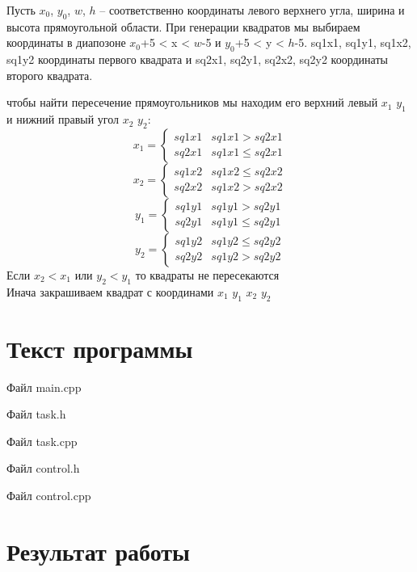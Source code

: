 \documentclass[14pt, a4paper]{extreport}
\begin{document}
Пусть $x_0$, $y_0$, $w$, $h$ -- соответственно координаты левого верхнего угла, ширина и высота прямоугольной области.
При генерации квадратов мы выбираем координаты в диапозоне $x_0$+5 < x < $w$-5 и $y_0$+5 < y < $h$-5.
sq1x1, sq1y1, sq1x2, sq1y2 координаты первого квадрата и sq2x1, sq2y1, sq2x2, sq2y2 координаты второго квадрата.
\par чтобы найти пересечение прямоугольников мы находим его верхний левый $x_1$ $y_1$ и нижний правый угол $x_2$ $y_2$:
$$ x_1 = \left\{ \begin{array}{lr} sq1x1 & sq1x1 > sq2x1\\ sq2x1 & sq1x1 \leq sq2x1 \end{array} \right. $$
$$ x_2 = \left\{ \begin{array}{lr} sq1x2 & sq1x2 \leq sq2x2\\ sq2x2 & sq1x2 > sq2x2 \end{array} \right. $$
$$ y_1 = \left\{ \begin{array}{lr} sq1y1 & sq1y1 > sq2y1\\ sq2y1 & sq1y1 \leq sq2y1 \end{array} \right. $$
$$ y_2 = \left\{ \begin{array}{lr} sq1y2 & sq1y2 \leq sq2y2\\ sq2y2 & sq1y2 > sq2y2 \end{array} \right. $$
Если $x_2 < x_1$ или $y_2 < y_1$ то квадраты не пересекаются\\
Инача закрашиваем квадрат с координами $x_1$ $y_1$ $x_2$ $y_2$


\chapter{Текст программы}

\noindent Файл main.cpp

\pagebreak
\hrulefill

\noindent Файл task.h

\hrulefill

\noindent Файл task.cpp

\hrulefill

\noindent Файл control.h

\hrulefill

\noindent Файл control.cpp


\chapter{Результат работы}
\end{document}
